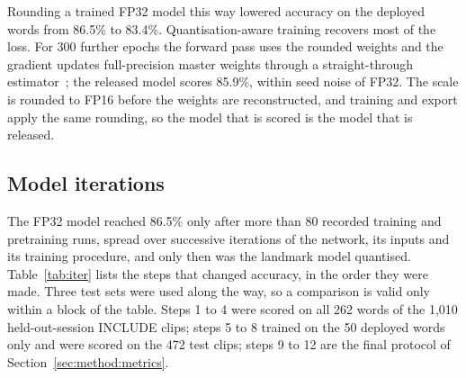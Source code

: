 \documentclass[pdflatex,sn-mathphys-num,twocolumn]{sn-jnl}
\theoremstyle{thmstyleone}%
\begin{document}
\begin{appendices}
Rounding a trained FP32 model this way lowered accuracy on the deployed words from 86.5\% to 83.4\%. Quantisation-aware training recovers most of the loss. For 300 further epochs the forward pass uses the rounded weights and the gradient updates full-precision master weights through a straight-through estimator~\cite{bengio2013ste,jacob2018quant}; the released model scores 85.9\%, within seed noise of FP32. The scale is rounded to FP16 before the weights are reconstructed, and training and export apply the same rounding, so the model that is scored is the model that is released.

\subsection{Model iterations}

The FP32 model reached 86.5\% only after more than 80 recorded training and pretraining runs, spread over successive iterations of the network, its inputs and its training procedure, and only then was the landmark model quantised. Table~\ref{tab:iter} lists the steps that changed accuracy, in the order they were made. Three test sets were used along the way, so a comparison is valid only within a block of the table. Steps 1 to 4 were scored on all 262 words of the 1,010 held-out-session INCLUDE clips; steps 5 to 8 trained on the 50 deployed words only and were scored on the 472 test clips; steps 9 to 12 are the final protocol of Section~\ref{sec:method:metrics}.


\end{appendices}
\end{document}
